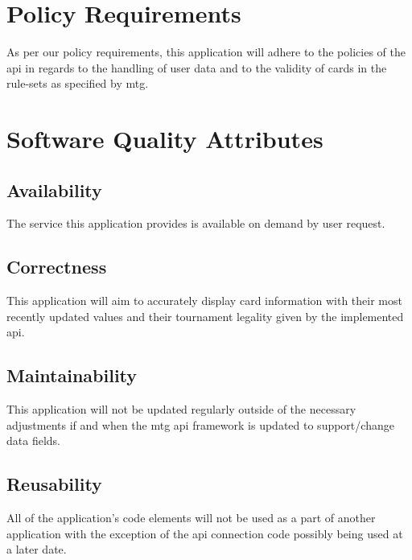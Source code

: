 \documentclass[12pt]{report}
\begin{document}
\section{Policy Requirements}
As per our policy requirements, this application will adhere to the policies of the \acrshort{api} in regards to the handling of user data and to the validity of cards in the rule-sets as specified by \acrshort{mtg}.
\section{Software Quality Attributes}
\subsection{Availability}
The service this application provides is available on demand by user request.
\subsection{Correctness}
This application will aim to accurately display card information with their most recently updated values and their tournament legality given by the implemented \acrshort{api}.
\subsection{Maintainability}
This application will not be updated regularly outside of the necessary 
adjustments if and when the \acrshort{mtg} \acrshort{api} framework is updated to support/change data fields.
\subsection{Reusability}
All of the application’s code elements will not be used as a part of another 
application with the exception of the \acrshort{api} connection code possibly being 
used at a later date.
\end{document}
